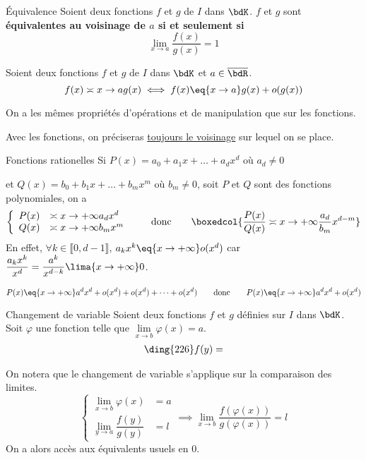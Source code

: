 \documentclass[a4paper,french,bookmarks]{article}
\begin{document}
\begin{definition}{Équivalence}{}
    Soient deux fonctions $f$ et $g$ de $I$ dans $\bdK$. $f$ et $g$ sont \bf{équivalentes} au voisinage de $a$ si et seulement si
    \[ \lim\limits_{x \to a} \dfrac{f(x)}{g(x)} = 1\]
\end{definition}

\begin{property}{}{}
     Soient deux fonctions $f$ et $g$ de $I$ dans $\bdK$ et $a \in \overline{\bdR}$.
     \[ f(x) \asymp{x \to a} g(x) \iff f(x) \eq{x \to a} g(x) + o(g(x))\]
\end{property}
\demo{

}

On a les mêmes propriétés d'opérations et de manipulation que sur les fonctions.

\begin{warning}{}{}
    Avec les fonctions, on préciseras \underline{toujours le voisinage} sur lequel on se place. 
\end{warning}

\begin{example}{Fonctions rationelles}{}
    Si $P(x) = a_0 + a_1x + \dots + a_dx^d$ où $a_d \neq 0$
    
    et $Q(x) = b_0 + b_1x + \dots + b_mx^m$ où $b_m \neq 0$, soit $P$ et $Q$ sont des fonctions polynomiales, on a
    \[ \left\lbrace\begin{array}{ll}
        P(x) &\asymp{x \to +\infty} a_dx^d  \\
        Q(x) &\asymp{x \to +\infty} b_mx^m
    \end{array}\right. \qquad \text{donc} \qquad \boxedcol{\dfrac{P(x)}{Q(x)}\asymp{x \to +\infty} \dfrac{a_d}{b_m}x^{d-m}}\]
    \tcblower
    En effet, $\forall k \in \llbracket 0, d-1 \rrbracket$, $a_k x^k \eq{x\to+\infty} o(x^d)$ car $\dfrac{a_kx^k}{x^d}=\dfrac{a^k}{x^{d-k}} \lima{x\to +\infty} 0$.
    
    \[P(x) \eq{x \to +\infty} a^dx^d + o(x^d) + o(x^d) + \dots + o(x^d) \qquad \text{donc} \qquad P(x) \eq{x \to +\infty} a^dx^d + o(x^d)\]
\end{example}

\begin{property}{Changement de variable}{}
     Soient deux fonctions $f$ et $g$ définies sur $I$ dans $\bdK$. Soit $\varphi$ une fonction telle que $\lim\limits_{x \to b} \varphi(x) = a$.
     \begin{align*}
         \text{\ding{226}} f(y) = 
     \end{align*}
\end{property}
\demo{
}
On notera que le changement de variable s'applique sur la comparaison des limites.
\[ \left\lbrace\begin{array}{ll}
    \lim\limits_{x \to b} \varphi(x) &= a \\
    \lim\limits_{y \to a} \dfrac{f(y)}{g(y)} &= l
\end{array}\right. \implies \lim\limits_{x \to b} \dfrac{f(\varphi(x))}{g(\varphi(x))} = l\]
On a alors accès aux équivalents usuels en $0$.
\end{document}
